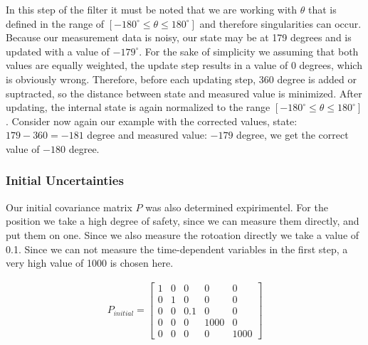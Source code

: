 \documentclass[11pt,oneside,openright]{mpreport}
\begin{document}
In this step of the filter it must be noted that we are working with $\theta$ that is defined in the range of $ [- 180^{\circ} \le \theta \le 180^{\circ}] $ and therefore singularities can occur.
Because our measurement data is noisy, our state may be at 179 degrees and is updated with a value of $ -179^{\circ} $. For the sake of simplicity we assuming that both values are equally weighted,
the update step results in a value of 0 degrees, which is obviously wrong. Therefore, before each updating step, $ 360 $ degree is added or suptracted,
so the distance between state and measured value is minimized. After updating, the internal state is again normalized to the range $ [- 180^{\circ} \le \theta \le 180^{\circ}] $.
Consider now again our example with the corrected values, state: $ 179-360 = -181 $ degree and measured value: $ -179 $ degree, we get the correct value of $ -180 $ degree.


\subsubsection{Initial Uncertainties}

Our initial covariance matrix $ P $ was also determined expirimentel. For the position we take a high degree of safety, since we can measure them directly, and put them on one. 
Since we also measure the rotoation directly we take a value of 0.1. Since we can not measure the time-dependent variables in the first step, a very high value of 1000 is chosen here.

\begin{align*}
P_{initial}=
\begin{bmatrix}
1 & 0 & 0 & 0 & 0\\
0 & 1 & 0 & 0 & 0\\
0 & 0 & 0.1 & 0 & 0\\
0 & 0 & 0 & 1000 & 0\\
0 & 0 & 0 & 0 & 1000
\end{bmatrix} 
\end{align*}
\end{document}

